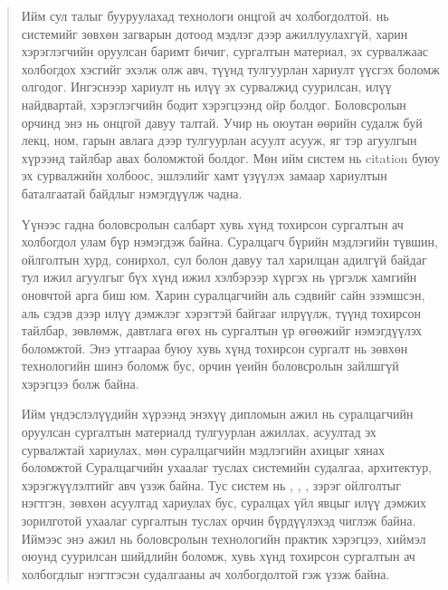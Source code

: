\begin{abstract}
Ийм сул талыг бууруулахад  технологи онцгой ач холбогдолтой.  нь системийг зөвхөн загварын дотоод мэдлэг дээр ажиллуулахгүй, харин хэрэглэгчийн оруулсан баримт бичиг, сургалтын материал, эх сурвалжаас холбогдох хэсгийг эхэлж олж авч, түүнд тулгуурлан хариулт үүсгэх боломж олгодог. Ингэснээр хариулт нь илүү эх сурвалжид суурилсан, илүү найдвартай, хэрэглэгчийн бодит хэрэгцээнд ойр болдог. Боловсролын орчинд энэ нь онцгой давуу талтай. Учир нь оюутан өөрийн судалж буй лекц, ном, гарын авлага дээр тулгуурлан асуулт асууж, яг тэр агуулгын хүрээнд тайлбар авах боломжтой болдог. Мөн ийм систем нь citation буюу эх сурвалжийн холбоос, эшлэлийг хамт үзүүлэх замаар хариултын баталгаатай байдлыг нэмэгдүүлж чадна.

Үүнээс гадна боловсролын салбарт хувь хүнд тохирсон сургалтын ач холбогдол улам бүр нэмэгдэж байна. Суралцагч бүрийн мэдлэгийн түвшин, ойлголтын хурд, сонирхол, сул болон давуу тал харилцан адилгүй байдаг тул ижил агуулгыг бүх хүнд ижил хэлбэрээр хүргэх нь үргэлж хамгийн оновчтой арга биш юм. Харин суралцагчийн аль сэдвийг сайн эзэмшсэн, аль сэдэв дээр илүү дэмжлэг хэрэгтэй байгааг илрүүлж, түүнд тохирсон тайлбар, зөвлөмж, давтлага өгөх нь сургалтын үр өгөөжийг нэмэгдүүлэх боломжтой. Энэ утгаараа  буюу хувь хүнд тохирсон сургалт нь зөвхөн технологийн шинэ боломж бус, орчин үеийн боловсролын зайлшгүй хэрэгцээ болж байна.

Ийм үндэслэлүүдийн хүрээнд энэхүү дипломын ажил нь суралцагчийн оруулсан сургалтын материалд тулгуурлан ажиллах, асуултад эх сурвалжтай хариулах, мөн суралцагчийн мэдлэгийн ахицыг хянах боломжтой Суралцагчийн ухаалаг туслах системийн судалгаа, архитектур, хэрэгжүүлэлтийг авч үзэж байна. Тус систем нь , , ,  зэрэг ойлголтыг нэгтгэн, зөвхөн асуултад хариулах бус, суралцах үйл явцыг илүү дэмжих зорилготой ухаалаг сургалтын туслах орчин бүрдүүлэхэд чиглэж байна. Иймээс энэ ажил нь боловсролын технологийн практик хэрэгцээ, хиймэл оюунд суурилсан шийдлийн боломж, хувь хүнд тохирсон сургалтын ач холбогдлыг нэгтгэсэн судалгааны ач холбогдолтой гэж үзэж байна.

\end{abstract}